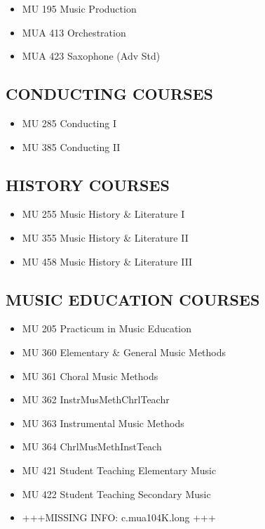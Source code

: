 \documentclass[
  letterpaper,
]{scrbook}
\providecommand{\tightlist}{%
  \setlength{\itemsep}{0pt}\setlength{\parskip}{0pt}}
\begin{document}
\begin{itemize}
\tightlist
\item
  MU 195 Music Production
\item
  MUA 413 Orchestration
\item
  MUA 423 Saxophone (Adv Std)
\end{itemize}

\subsection{CONDUCTING COURSES}\label{conducting-courses}

\begin{itemize}
\tightlist
\item
  MU 285 Conducting I
\item
  MU 385 Conducting II
\end{itemize}

\subsection{HISTORY COURSES}\label{history-courses}

\begin{itemize}
\tightlist
\item
  MU 255 Music History \& Literature I
\item
  MU 355 Music History \& Literature II
\item
  MU 458 Music History \& Literature III
\end{itemize}

\subsection{MUSIC EDUCATION COURSES}\label{music-education-courses}

\begin{itemize}
\tightlist
\item
  MU 205 Practicum in Music Education
\item
  MU 360 Elementary \& General Music Methods
\item
  MU 361 Choral Music Methods
\item
  MU 362 InstrMusMethChrlTeachr
\item
  MU 363 Instrumental Music Methods
\item
  MU 364 ChrlMusMethInstTeach
\item
  MU 421 Student Teaching Elementary Music
\item
  MU 422 Student Teaching Secondary Music
\item
  +++MISSING INFO: c.mua104K.long +++
\end{itemize}
\end{document}
